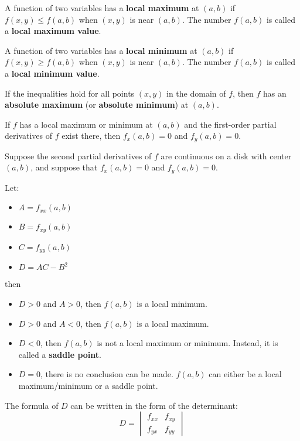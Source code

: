 \newpage

    \par A function of two variables has a \textbf{local maximum} at $(a, b)$ if
    $f(x, y) \leq f(a, b)$ when $(x, y)$ is near $(a, b)$. The number $f(a, b)$ is
    called a \textbf{local maximum value}.
    \par A function of two variables has a \textbf{local minimum} at $(a, b)$ if
    $f(x, y) \geq f(a, b)$ when $(x, y)$ is near $(a, b)$. The number $f(a, b)$ is
    called a \textbf{local minimum value}.
    \par If the inequalities hold for all points $(x, y)$ in the domain of $f$, then $f$
    has an \textbf{absolute maximum} (or \textbf{absolute minimum}) at $(a, b)$.

    \par If $f$ has a local maximum or minimum at $(a, b)$ and the first-order partial
    derivatives of $f$ exist there, then $f_{x}(a, b) = 0$ and $f_{y} (a, b) = 0$.
    
    \par Suppose the second partial derivatives of $f$ are continuous on a disk with center
    $(a, b)$, and suppose that $f_{x}(a, b) = 0$ and $f_{y}(a, b) = 0$.
    \par Let:
    \begin{itemize}
      \item $A = f_{xx}(a, b)$
      \item $B = f_{xy}(a, b)$
      \item $C = f_{yy}(a, b)$
      \item $D = AC - B^{2}$
    \end{itemize}
    then
    \begin{itemize}
      \item $D > 0$ and $A > 0$, then $f(a, b)$ is a local minimum.
      \item $D > 0$ and $A < 0$, then $f(a, b)$ is a local maximum.
      \item $D < 0$, then $f(a, b)$ is not a local maximum or minimum. Instead, it
        is called a \textbf{saddle point}.
      \item $D = 0$, there is no conclusion can be made. $f(a, b)$ can either be a
        local maximum/minimum or a saddle point.
    \end{itemize}
    \par The formula of $D$ can be written in the form of the determinant:
    \begin{equation}
      D = 
      \begin{vmatrix}
        f_{xx} & f_{xy} \\
        f_{yx} & f_{yy}
      \end{vmatrix}
    \end{equation}

